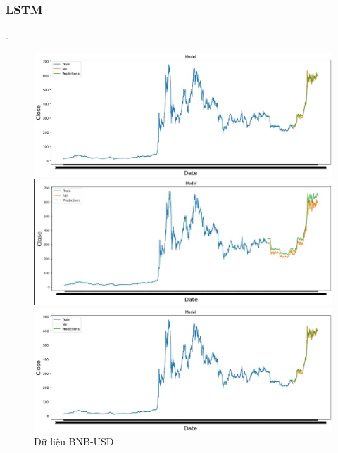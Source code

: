 \documentclass[conference]{IEEEtran}
\begin{document}
	\subsubsection{LSTM}.
	\begin{figure}[H]
		\centering
		\begin{minipage}{0.15\textwidth}
			\centering
			\includegraphics[width=1\textwidth]{Figure/BNB_LSTM.jpg}
		\end{minipage}
		\hfill
		\begin{minipage}{0.15\textwidth}
			\centering
			\includegraphics[width=1\textwidth]{Figure/LSTM_I.jpg}
		\end{minipage}
		\hfill
		\begin{minipage}{0.15\textwidth}
			\centering
			\includegraphics[width=1\textwidth]{Figure/BNB_LSTM.jpg}
		\end{minipage}
		\caption{Dữ liệu BNB-USD}
		\label{fig:1}
	\end{figure}
	
\end{document}
